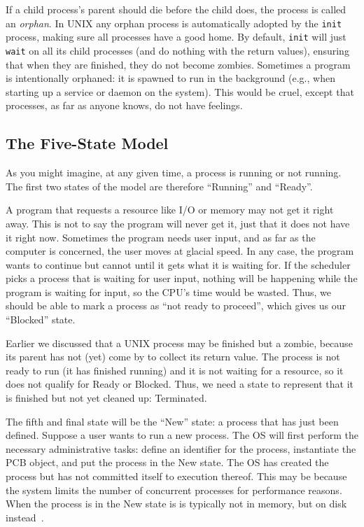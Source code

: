 If a child process's parent should die before the child does, the process is called an \textit{orphan}. In UNIX any orphan process is automatically adopted by the \texttt{init} process, making sure all processes have a good home. By default, \texttt{init} will just \texttt{wait} on all its child processes (and do nothing with the return values), ensuring that when they are finished, they do not become zombies. Sometimes a program is intentionally orphaned: it is spawned to run in the background (e.g., when starting up a service or daemon on the system). This would be cruel, except that processes, as far as anyone knows, do not have feelings.

\subsection*{The Five-State Model}

As you might imagine, at any given time, a process is running or not running. The first two states of the model are therefore ``Running'' and ``Ready''.

A program that requests a resource like I/O or memory may not get it right away. This is not to say the program will never get it, just that it does not have it right now. Sometimes the program needs user input, and as far as the computer is concerned, the user moves at glacial speed. In any case, the program wants to continue but cannot until it gets what it is waiting for.  If the scheduler picks a process that is waiting for user input, nothing will be happening while the program is waiting for input, so the CPU's time would be wasted. Thus, we should be able to mark a process as ``not ready to proceed'', which gives us our ``Blocked'' state.

Earlier we discussed that a UNIX process may be finished but a zombie, because its parent has not (yet) come by to collect its return value. The process is not ready to run (it has finished running) and it is not waiting for a resource, so it does not qualify for Ready or Blocked. Thus, we need a state to represent that it is finished but not yet cleaned up: Terminated.

The fifth and final state will be the ``New'' state: a process that has just been defined. Suppose a user wants to run a new process. The OS will first perform the necessary administrative tasks: define an identifier for the process, instantiate the PCB object, and put the process in the New state. The OS has created the process but has not committed itself to execution thereof. This may be because the system limits the number of concurrent processes for performance reasons. When the process is in the New state is is typically not in memory, but on disk instead~\cite{osi}.

